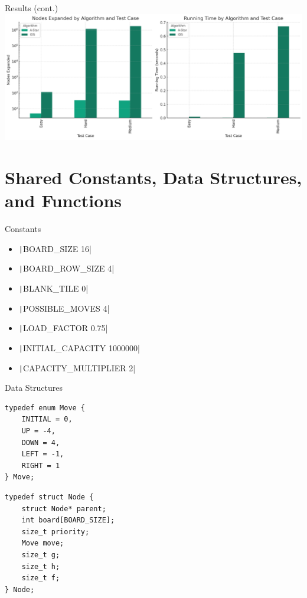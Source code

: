 \documentclass{oxblue-beamer}
\begin{document}
\begin{frame}{Results (cont.)}
\includegraphics[width=\textwidth]{assets/results.png}
\end{frame}

\section{Shared Constants, Data Structures, and Functions}

\begin{frame}{Constants}
\begin{itemize}
    \item \texttt|BOARD_SIZE 16|
    \item \texttt|BOARD_ROW_SIZE 4|
    \item \texttt|BLANK_TILE 0|
    \item \texttt|POSSIBLE_MOVES 4|
    \item \texttt|LOAD_FACTOR 0.75|
    \item \texttt|INITIAL_CAPACITY 1000000|
    \item \texttt|CAPACITY_MULTIPLIER 2|
\end{itemize}
\end{frame}

\begin{frame}[fragile]{Data Structures}
\begin{multicols}{2}
\begin{verbatim}
typedef enum Move {
    INITIAL = 0,
    UP = -4,
    DOWN = 4,
    LEFT = -1,
    RIGHT = 1
} Move;
\end{verbatim}
\columnbreak
\begin{verbatim}
typedef struct Node {
    struct Node* parent;
    int board[BOARD_SIZE];
    size_t priority;
    Move move;
    size_t g;
    size_t h;
    size_t f;
} Node;
\end{verbatim}
\end{multicols}
\end{frame}
\end{document}
